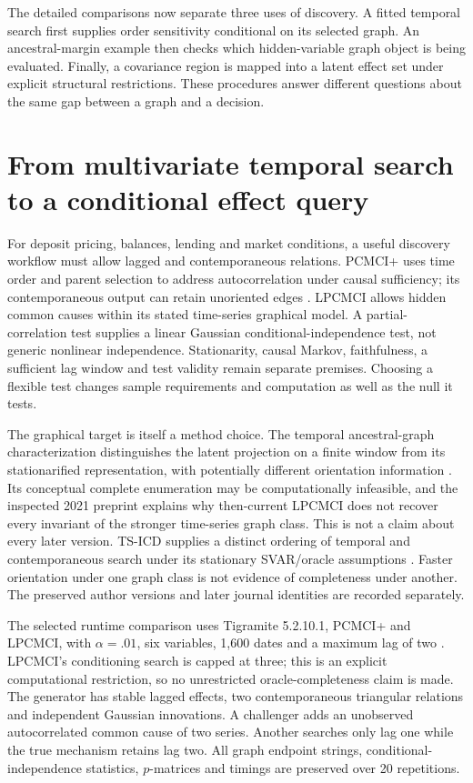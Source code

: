 The detailed comparisons now separate three uses of discovery. A fitted
temporal search first supplies order sensitivity conditional on its selected
graph. An ancestral-margin example then checks which hidden-variable graph
object is being evaluated. Finally, a covariance region is mapped into a
latent effect set under explicit structural restrictions. These procedures
answer different questions about the same gap between a graph and a decision.



\section{From multivariate temporal search to a conditional effect query}
\label{s5:discovery}
For deposit pricing, balances, lending and market conditions, a useful
discovery workflow must allow lagged and contemporaneous relations. PCMCI+
uses time order and parent selection to address autocorrelation under causal
sufficiency; its contemporaneous output can retain unoriented edges
\citep{runge2020}. LPCMCI allows hidden common causes within its stated
time-series graphical model. A partial-correlation test supplies a linear
Gaussian conditional-independence test, not generic nonlinear independence.
Stationarity, causal Markov, faithfulness, a sufficient lag window and test
validity remain separate premises. Choosing a flexible test changes sample
requirements and computation as well as the null it tests.

The graphical target is itself a method choice. The temporal ancestral-graph
characterization distinguishes the latent projection on a finite window from
its stationarified representation, with potentially different orientation
information \citep[Sections 4.5--4.6 and Propositions 5.2--5.7]{gerhardus2021}.
Its conceptual complete enumeration may be computationally infeasible, and
the inspected 2021 preprint explains why then-current LPCMCI does not recover
every invariant of the stronger time-series graph class. This is not a
claim about every later version. TS-ICD supplies a distinct ordering of
temporal and contemporaneous search under its stationary SVAR/oracle
assumptions \citep{rohekar2023}. Faster orientation under one graph class
is not evidence of completeness under another. The preserved author versions
and later journal identities are recorded separately.

The selected runtime comparison uses Tigramite 5.2.10.1, PCMCI+ and LPCMCI,
with $\alpha=.01$, six variables, 1,600 dates and a maximum lag of two
\citep{runtime_tigramite_scope}. LPCMCI's conditioning search is capped at
three; this is an explicit computational restriction, so no unrestricted
oracle-completeness claim is made. The generator has stable lagged effects,
two contemporaneous triangular relations and independent Gaussian
innovations. A challenger adds an unobserved autocorrelated common cause
of two series. Another searches only lag one while the true mechanism
retains lag two. All graph endpoint strings, conditional-independence
statistics, $p$-matrices and timings are preserved over 20 repetitions.

